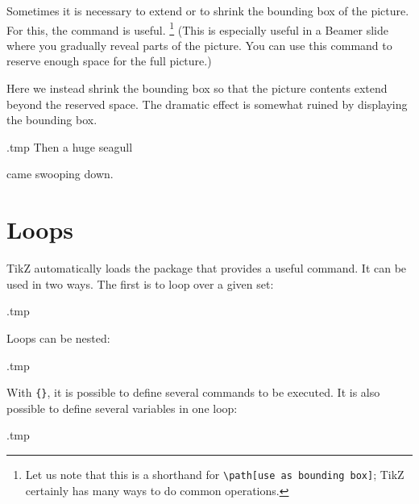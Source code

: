 Sometimes it is necessary to extend or to shrink the bounding box of the picture.
For this, the  command is useful.%
\footnote{Let us note that this is a shorthand for
\texttt{\textbackslash{}path[use as bounding box]};
TikZ certainly has many ways to do common operations.}
(This is especially useful in a Beamer slide where you gradually reveal parts of the picture.
You can use this command to reserve enough space for the full picture.)

Here we instead shrink the bounding box
so that the picture contents extend beyond the reserved space.
The dramatic effect is somewhat ruined by displaying the bounding box.
%
\begin{VerbatimOut}{\jobname.tmp}
\centering
Then a huge seagull
came swooping down.
\end{VerbatimOut}
\ShowExampleBelow[2]



%
%
\section{Loops}

TikZ automatically loads the  package that provides a useful  command.
It can be used in two ways.
The first is to loop over a given set:
%
\begin{VerbatimOut}{\jobname.tmp}
\centering
{}
\end{VerbatimOut}
\ShowExampleBelow[2]
%
Loops can be nested:
%
\begin{VerbatimOut}{\jobname.tmp}
\centering
{}
\end{VerbatimOut}
\ShowExampleBelow[2]
With \verb|{}|, it is possible to define several commands to be executed.
It is also possible to define several variables in one loop:
%
\begin{VerbatimOut}{\jobname.tmp}
\centering
{}
\end{VerbatimOut}
\ShowExampleBelow[2]

